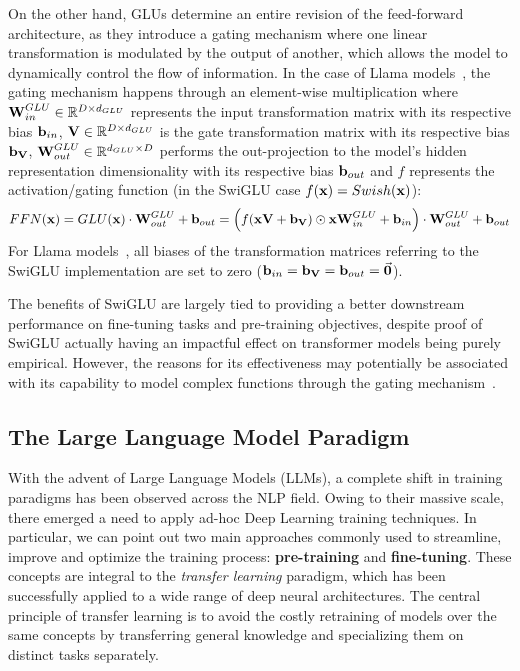 On the other hand, GLUs determine an entire revision of the feed-forward architecture, as they introduce a gating mechanism where one linear transformation is modulated by the output of another, which allows the model to dynamically control the flow of information.
In the case of Llama models~\cite{touvron2023,dubey2024}, the gating mechanism happens through an element-wise multiplication where $\bm{\mathbf{W}}_{in}^{GLU} \in \mathbb{R}^{D \times d_{GLU}}$ represents the input transformation matrix with its respective bias $\bm{\mathbf{b}}_{in}$, $\bm{\mathbf{V}} \in \mathbb{R}^{D \times d_{GLU}}$ is the gate transformation matrix with its respective bias $\bm{\mathbf{b_{V}}}$, $\bm{\mathbf{W}}_{out}^{GLU} \in \mathbb{R}^{d_{GLU} \times D}$ performs the out-projection to the model's hidden representation dimensionality with its respective bias $\bm{\mathbf{b}}_{out}$ and $f$ represents the activation/gating function (in the SwiGLU case $f(\bm{\mathbf{x}}) = Swish(\bm{\mathbf{x}})$):
\begin{equation}
    \label{eq:background_ffnn}
    FFN(\bm{\mathbf{x}}) = GLU(\bm{\mathbf{x}}) \cdot \bm{\mathbf{W}}_{out}^{GLU} + \bm{\mathbf{b}}_{out} 
    = \Bigl( f(\bm{\mathbf{x}}\bm{\mathbf{V}} + \bm{\mathbf{b_V}}) \odot \bm{\mathbf{x}}\bm{\mathbf{W}}_{in}^{GLU} + \bm{\mathbf{b}}_{in} \Bigr) \cdot \bm{\mathbf{W}}_{out}^{GLU} + \bm{\mathbf{b}}_{out}
\end{equation}
For Llama models~\cite{touvron2023,dubey2024}, all biases of the transformation matrices referring to the SwiGLU implementation are set to zero ($\bm{\mathbf{b}}_{in} = \bm{\mathbf{b_V}} = \bm{\mathbf{b}}_{out} = \vec {\bm{\mathbf{0}}}$).

The benefits of SwiGLU are largely tied to providing a better downstream performance on fine-tuning tasks and pre-training objectives, despite proof of SwiGLU actually having an impactful effect on transformer models being purely empirical.
However, the reasons for its effectiveness may potentially be associated with its capability to model complex functions through the gating mechanism~\cite{shazeer2020,shibuya2023}.

\subsection{The Large Language Model Paradigm}

With the advent of Large Language Models (LLMs), a complete shift in training paradigms has been observed across the NLP field.
Owing to their massive scale, there emerged a need to apply ad-hoc Deep Learning training techniques.
In particular, we can point out two main approaches commonly used to streamline, improve and optimize the training process: \textbf{pre-training} and \textbf{fine-tuning}.
These concepts are integral to the \emph{transfer learning} paradigm, which has been successfully applied to a wide range of deep neural architectures.
The central principle of transfer learning is to avoid the costly retraining of models over the same concepts by transferring general knowledge and specializing them on distinct tasks separately. 

